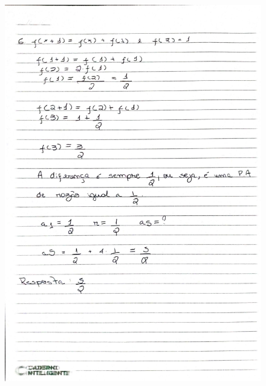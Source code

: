 \documentclass[
  12pt,     %
  openright,      %
  oneside,      %
  a4paper     %
  ]{abntex2}
\begin{document}
\begin{figure}[H]
  \centering
  \includegraphics[scale=0.23]{pagina14.jpg}
\end{figure}
\end{document}
